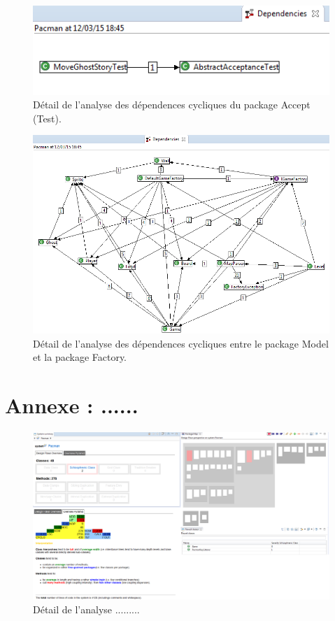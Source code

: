 \documentclass[12pt,a4paper,final]{article}
\begin{document}
\begin{figure}[ht]
	\centering
	\includegraphics[width=\textwidth]{images/DependenciesAcceptTest.png}
	\caption{\label{dependenciesAT}Détail de l'analyse des dépendences cycliques du package Accept (Test).}
\end{figure}

\begin{figure}[ht]
	\centering
	\includegraphics[width=\textwidth]{images/DependenciesModel_Factory.png} %
	\caption{\label{dependenciesMF}Détail de l'analyse des dépendences cycliques entre le package Model et la package Factory.} %
\end{figure}


\clearpage
\newpage
\section{Annexe : ......}\label{InCode}

\begin{figure}[ht]
	\centering
	\includegraphics[width=\textwidth]{images/InCodeDesignFlaws.png}
	\caption{\label{incodeDF}Détail de l'analyse .........}
\end{figure}
\end{document}
